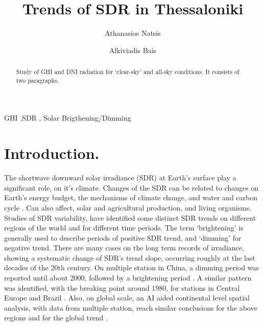 \documentclass[preprint, 3p,
authoryear]{elsarticle} %
\begin{document}
\begin{frontmatter}

  \title{Trends of SDR in Thessaloniki}
    \author[Laboratory of Atmospheric Physics]{Athanasios Natsis%
  }
    \author[Laboratory of Atmospheric Physics]{Alkiviadis Bais%
  }
  
  \begin{abstract}
  Study of GHI and DNI radiation for `clear-sky' and all-sky conditions.
  It consists of two paragraphs.
  \end{abstract}
    \begin{keyword}
    GHI \sep SDR \sep 
    Solar Brigthening/Dimming
  \end{keyword}
  
 \end{frontmatter}

\hypertarget{introduction.}{%
\section{Introduction.}\label{introduction.}}

The shortwave downward solar irradiance (SDR) at Earth's surface play a
significant role, on it's climate. Changes of the SDR can be related to
changes on Earth's energy budget, the mechanisms of climate change, and
water and carbon cycle \citep{Wild2009}. Can also affect, solar and
agricultural production, and living organisms. Studies of SDR
variability, have identified some distinct SDR trends on different
regions of the world and for different time periods. The term
`brightening' is generally used to describe periods of positive SDR
trend, and `dimming' for negative trend. There are many cases on the
long term records of irradiance, showing a systematic change of SDR's
trend slope, occurring roughly at the last decades of the 20th century.
On multiple station in China, a dimming period was reported until about
2000, followed by a brightening period \citep{Yang2021}. A similar
pattern was identified, with the breaking point around 1980, for
stations in Central Europe \citep{Wild2021} and Brazil
\citep{Yamasoe2021}. Also, on global scale, an AI aided continental
level spatial analysis, with data from multiple station, reach similar
conclusions for the above regions and for the global trend
\citep{Yuan2021}.
\end{document}
